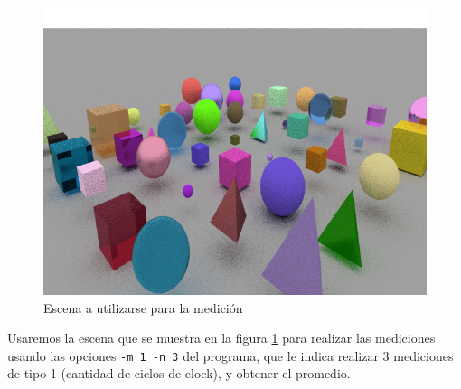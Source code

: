 \begin{figure}
    \centering
    \includegraphics[width=\textwidth]{./imgs/exp2-scene.png}
    \caption{Escena a utilizarse para la medición}
    \label{fig:exp2-scene}
\end{figure}

Usaremos la escena que se muestra en la figura \ref{fig:exp2-scene} para
realizar las mediciones usando las opciones \texttt{-m 1 -n 3} del programa, que
le indica realizar 3 mediciones de tipo 1 (cantidad de ciclos de clock), y
obtener el promedio.

